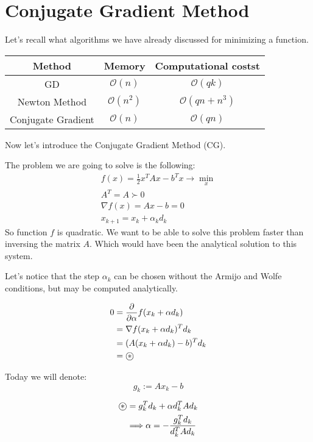 \section{Conjugate Gradient Method}

Let's recall what algorithms we have already discussed for minimizing a function. 

\begin{table}[!ht]
    \centering
    \begin{tabular}{c c c}
        \toprule
        \textbf{Method} & \textbf{Memory} & \textbf{Computational costst} \\
        \midrule
        GD & $\mathcal{O}(n)$ & $\mathcal{O}(qk)$ \\
        \midrule
        Newton Method & $\mathcal{O}(n^2)$ & $\mathcal{O}(qn + n^3)$ \\
        \midrule
        Conjugate Gradient & $\mathcal{O}(n)$ & $\mathcal{O}(qn)$ \\
        \bottomrule
    \end{tabular}
\end{table}

Now let's introduce the Conjugate Gradient Method (CG). 

The problem we are going to solve is the following:
\begin{gather*}
    f(x) = \frac{1}{2} x^T A x - b^T x \to \min_x \\ A^T = A \succ 0 \\ 
    \nabla f(x) = Ax - b = 0 \\ 
    x_{k+1} = x_k + \alpha_k d_k
\end{gather*}
So function $f$ is quadratic. We want to be able to solve this problem faster than inversing the matrix $A$. Which would have been the analytical solution to this system.

Let's notice that the step $\alpha_k$ can be chosen without the Armijo and Wolfe conditions, but may be computed analytically.

\begin{align*}
    0 &= \frac{\partial}{\partial \alpha} f(x_k + \alpha d_k) \\ 
    &= \nabla f(x_k + \alpha d_k)^T d_k \\
    &= (A(x_k + \alpha d_k) - b)^T d_k \\
    &= \oast
\end{align*}

Today we will denote: 
\[ 
    g_k := A x_k - b
\] 

\begin{align*}
    \oast &= g^T_k d_k + \alpha d_k^T A d_k  \\ 
    &\Longrightarrow \alpha = - \frac{g_k^T d_k}{d_k^T A d_k}
\end{align*}

